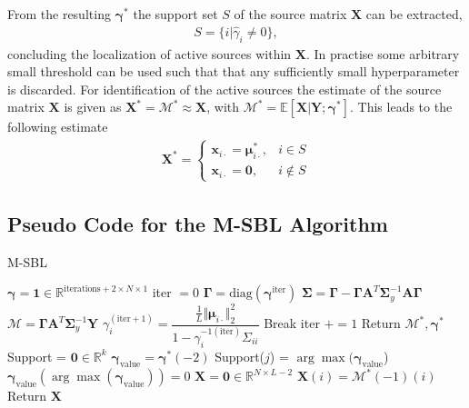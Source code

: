 From the resulting $\boldsymbol{\gamma}^\ast$ the support set $S$ of the source matrix $\mathbf{X}$ can be extracted, 
\begin{align*}
S = \{ i \vert \hat{\gamma}_i \neq 0 \},
\end{align*}
concluding the localization of active sources within $\mathbf{X}$. 
In practise some arbitrary small threshold can be used such that that any sufficiently small hyperparameter is discarded.
For identification of the active sources the estimate of the source matrix $\mathbf{X}$ is given as $\mathbf{X}^\ast = \mathcal{M}^\ast \approx \mathbf{X}$, with $\mathcal{M}^\ast = \mathbb{E}[\mathbf{X}\vert \mathbf{Y} ; \boldsymbol{\gamma}^\ast]$. 
This leads to the following estimate  
\begin{align*}
\mathbf{X}^\ast = 
\begin{cases}
\mathbf{x}_{i\cdot} = \boldsymbol{\mu}_{i \cdot}^\ast, & i \in S \\
\mathbf{x}_{i\cdot} = \mathbf{0}, & i \not \in S
\end{cases}
\end{align*}

\subsection{Pseudo Code for the M-SBL Algorithm}
\begin{algorithm}[H]
\caption{M-SBL}
\begin{algorithmic}[1]
\State $\boldsymbol{\gamma} = \mathbf{1} \in \mathbb{R}^{\text{iterations} + 2 \times N \times 1}$
\State iter $= 0$
	\State $\boldsymbol{\Gamma} = \text{diag}(\boldsymbol{\gamma}^\text{iter})$
		\State $\boldsymbol{\Sigma} = \boldsymbol{\Gamma} - \boldsymbol{\Gamma} \mathbf{A}^T \boldsymbol{\Sigma}_y^{-1} \mathbf{A} \boldsymbol{\Gamma}$
		\State $\mathcal{M} = \boldsymbol{\Gamma} \mathbf{A}^T \boldsymbol{\Sigma}_y^{-1} \mathbf{Y}$
		\State $\gamma_i^{(\text{iter} + 1)} = \dfrac{\frac{1}{L} \Vert \boldsymbol{\mu}_{i \cdot} \Vert_2^2}{1 - \gamma_i^{-1 (\text{iter})} \Sigma_{ii}}$
	\EndFor
		\State Break
	\EndIf
	\State iter $+= 1$
\EndWhile
\State Return $\mathcal{M}^\ast, \boldsymbol{\gamma}^\ast$
\EndProcedure
{}
\State Support = $\mathbf{0} \in \mathbb{R}^{k}$
\State $\boldsymbol{\gamma}_{\text{value}} = \boldsymbol{\gamma}^\ast (-2)$
		\State Support($j$) = $\arg \max (\boldsymbol{\gamma}_{\text{value}}$)
		\State $\boldsymbol{\gamma}_{\text{value}}(\arg \max (\boldsymbol{\gamma}_{\text{value}})) = 0$
	\EndIf
\EndFor
\State $\mathbf{X} = \mathbf{0} \in \mathbb{R}^{N \times L-2}$
	\State $\mathbf{X}(i) = \mathcal{M}^\ast(-1)(i)$
\EndFor
\State Return $\mathbf{X}$
\EndProcedure
\end{algorithmic}
\end{algorithm}

